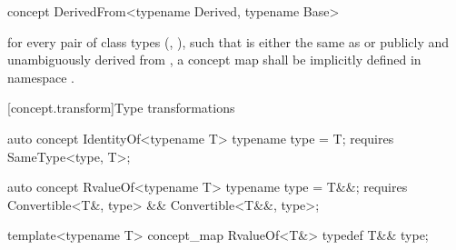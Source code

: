 \documentclass[american,twoside]{book}
\begin{document}
\begin{itemdecl}
concept DerivedFrom<typename Derived, typename Base> { }
\end{itemdecl}

\begin{itemdescr}
\pnum
\mbox{\requires}
for every pair of class types (\mbox{}, \mbox{}),
such that \mbox{} is either the same as or publicly and
unambiguously derived from \mbox{}, a concept map
\mbox{} shall be implicitly defined in namespace
\mbox{}.
\end{itemdescr}

[concept.transform]{Type transformations}
\pnum
{}

\pnum
{}

\begin{itemdecl}
auto concept IdentityOf<typename T> {
  typename type = T;
  requires SameType<type, T>;
}
\end{itemdecl}

\begin{itemdescr}
\pnum
{} 
\end{itemdescr}

\begin{itemdecl}
auto concept RvalueOf<typename T> {
  typename type = T&&;
  requires Convertible<T&, type> && Convertible<T&&, type>;
}
\end{itemdecl}

\begin{itemdescr}
\pnum
{} 
\end{itemdescr}

\begin{itemdecl}
template<typename T> concept_map RvalueOf<T&> {
  typedef T&& type;
}
\end{itemdecl}

\begin{itemdescr}
\pnum
{}
\end{itemdescr}
\end{document}
